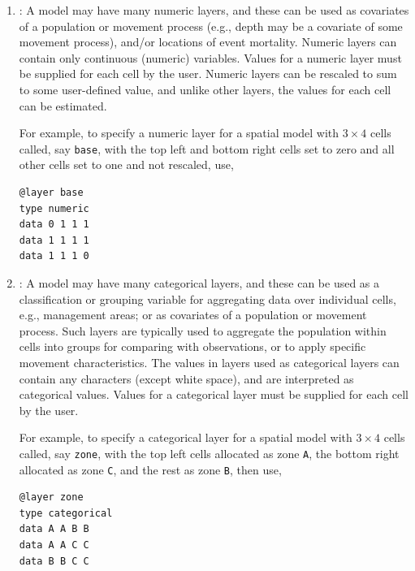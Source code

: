 \begin{enumerate}
\item{\label{numeric-layer}}: A model may have many numeric layers, and these can be used as covariates of a population or movement process (e.g., depth may be a covariate of some movement process), and/or locations of event mortality. Numeric layers can contain only continuous (numeric) variables. Values for a numeric layer must be supplied for each cell by the user. Numeric layers can be rescaled to sum to some user-defined value, and unlike other layers, the values for each cell can be estimated. 

For example, to specify a numeric layer for a spatial model with $3 \times 4$ cells called, say \texttt{base}, with the top left and bottom right cells set to zero and all other cells set to one and not rescaled, use,
{\small{\begin{verbatim}
@layer base
type numeric
data 0 1 1 1
data 1 1 1 1
data 1 1 1 0
\end{verbatim}}}

\item {\label{categorical-layer}}: A model may have many categorical layers, and these can be used as a classification or grouping variable for aggregating data over individual cells, e.g., management areas; or as covariates of a population or movement process. Such layers are typically used to aggregate the population within cells into groups for comparing with observations, or to apply specific movement characteristics. The values in layers used as categorical layers can contain any characters (except white space), and are interpreted as categorical values. Values for a categorical layer must be supplied for each cell by the user.

For example, to specify a categorical layer for a spatial model with $3 \times 4$ cells called, say \texttt{zone}, with the top left cells allocated as zone \texttt{A}, the bottom right allocated as zone \texttt{C}, and the rest as zone \texttt{B}, then use,
{\small{\begin{verbatim}
@layer zone
type categorical
data A A B B
data A A C C
data B B C C
\end{verbatim}}}


\end{enumerate}
